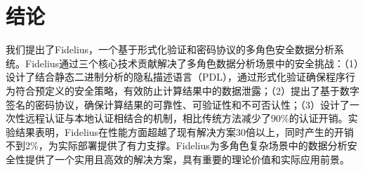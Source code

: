 \section{结论}\label{sec:conclude}
我们提出了Fidelius，一个基于形式化验证和密码协议的多角色安全数据分析系统。Fidelius通过三个核心技术贡献解决了多角色数据分析场景中的安全挑战：（1）设计了结合静态二进制分析的隐私描述语言（PDL），通过形式化验证确保程序行为符合预定义的安全策略，有效防止计算结果中的数据泄露；（2）提出了基于数字签名的密码协议，确保计算结果的可靠性、可验证性和不可否认性；（3）设计了一次性远程认证与本地认证相结合的机制，相比传统方法减少了90\%的认证开销。实验结果表明，Fidelius在性能方面超越了现有解决方案30倍以上，同时产生的开销不到2\%，为实际部署提供了有力支撑。Fidelius为多角色复杂场景中的数据分析安全性提供了一个实用且高效的解决方案，具有重要的理论价值和实际应用前景。 